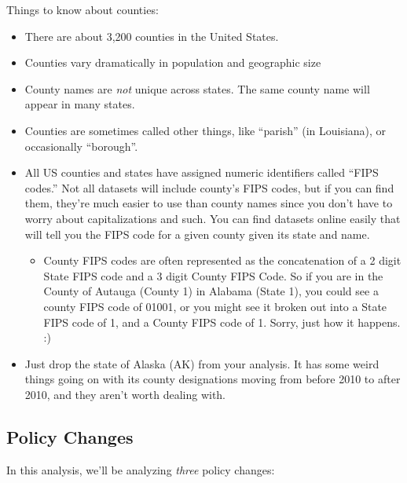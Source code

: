 \documentclass[12pt]{article}
\begin{document}
Things to know about counties:

\begin{itemize}
  \item There are about 3,200 counties in the United States.
  \item Counties vary dramatically in population and geographic size
  \item County names are \emph{not} unique across states. The same county name will appear in many states.
  \item Counties are sometimes called other things, like ``parish'' (in Louisiana), or occasionally ``borough''.
  \item All US counties and states have assigned numeric identifiers called ``FIPS codes.'' Not all datasets will include county's FIPS codes, but if you can find them, they're much easier to use than county names since you don't have to worry about capitalizations and such. You can find datasets online easily that will tell you the FIPS code for a given county given its state and name.
  \begin{itemize}
    \item County FIPS codes are often represented as the concatenation of a 2 digit State FIPS code and a 3 digit County FIPS Code. So if you are in the County of Autauga (County 1) in Alabama (State 1), you could see a county FIPS code of 01001, or you might see it broken out into a State FIPS code of 1, and a County FIPS code of 1. Sorry, just how it happens. :)
  \end{itemize}
  \item Just drop the state of Alaska (AK) from your analysis. It has some weird things going on with its county designations moving from before 2010 to after 2010, and they aren't worth dealing with.
\end{itemize}

\subsection*{Policy Changes}

In this analysis, we'll be analyzing \emph{three} policy changes:
\end{document}
